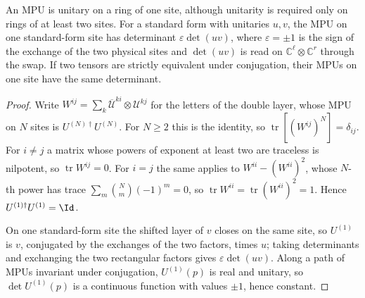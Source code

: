 \begin{lemma}
    \label{lem:mpu_conjugation_one_site_determinant}
    \leanok
    An MPU is unitary on a ring of one site, although unitarity is required
    only on rings of at least two sites. For a standard form with unitaries
    $u,v$, the MPU on one standard-form site has determinant
    $\varepsilon\det(uv)$, where $\varepsilon=\pm1$ is the sign of the exchange
    of the two physical sites and $\det(uv)$ is read on
    $\mathbb C^\ell\otimes\mathbb C^r$ through the swap. If two tensors are
    strictly equivalent under conjugation, their MPUs on one site have the
    same determinant.
\end{lemma}

\begin{proof}
    \leanok
    Write $W^{ij}=\sum_k\overline{\mathcal U}^{ki}\otimes\mathcal U^{kj}$ for
    the letters of the double layer, whose MPU on $N$ sites is
    $U^{(N)\dagger}U^{(N)}$. For $N\geq2$ this is the identity, so
    $\operatorname{tr}[(W^{ij})^N]=\delta_{ij}$. For $i\neq j$ a matrix whose
    powers of exponent at least two are traceless is nilpotent, so
    $\operatorname{tr}W^{ij}=0$. For $i=j$ the same applies to
    $W^{ii}-(W^{ii})^2$, whose $N$-th power has trace
    $\sum_m\binom Nm(-1)^m=0$, so
    $\operatorname{tr}W^{ii}=\operatorname{tr}(W^{ii})^2=1$. Hence
    $U^{(1)\dagger}U^{(1)}=\Id$.

    On one standard-form site the shifted layer of $v$ closes on the same
    site, so $U^{(1)}$ is $v$, conjugated by the exchanges of the two factors,
    times $u$; taking determinants and exchanging the two rectangular factors
    gives $\varepsilon\det(uv)$. Along a path of MPUs invariant under
    conjugation, $U^{(1)}(p)$ is real and unitary, so $\det U^{(1)}(p)$ is a
    continuous function with values $\pm1$, hence constant.
\end{proof}

